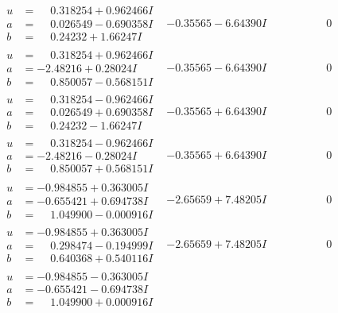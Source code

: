 \documentclass[1p]{elsarticle_modified}
\theoremstyle{definition}
\begin{document}
$$\begin{array}{c|c|c}
\begin{aligned}
u &= \phantom{-}0.318254 + 0.962466 I \\
a &= \phantom{-}0.026549 - 0.690358 I \\
b &= \phantom{-}0.24232 + 1.66247 I\end{aligned}
 & -0.35565 - 6.64390 I & \phantom{-0.000000 } 0 \\ \hline\begin{aligned}
u &= \phantom{-}0.318254 + 0.962466 I \\
a &= -2.48216 + 0.28024 I \\
b &= \phantom{-}0.850057 - 0.568151 I\end{aligned}
 & -0.35565 - 6.64390 I & \phantom{-0.000000 } 0 \\ \hline\begin{aligned}
u &= \phantom{-}0.318254 - 0.962466 I \\
a &= \phantom{-}0.026549 + 0.690358 I \\
b &= \phantom{-}0.24232 - 1.66247 I\end{aligned}
 & -0.35565 + 6.64390 I & \phantom{-0.000000 } 0 \\ \hline\begin{aligned}
u &= \phantom{-}0.318254 - 0.962466 I \\
a &= -2.48216 - 0.28024 I \\
b &= \phantom{-}0.850057 + 0.568151 I\end{aligned}
 & -0.35565 + 6.64390 I & \phantom{-0.000000 } 0 \\ \hline\begin{aligned}
u &= -0.984855 + 0.363005 I \\
a &= -0.655421 + 0.694738 I \\
b &= \phantom{-}1.049900 - 0.000916 I\end{aligned}
 & -2.65659 + 7.48205 I & \phantom{-0.000000 } 0 \\ \hline\begin{aligned}
u &= -0.984855 + 0.363005 I \\
a &= \phantom{-}0.298474 - 0.194999 I \\
b &= \phantom{-}0.640368 + 0.540116 I\end{aligned}
 & -2.65659 + 7.48205 I & \phantom{-0.000000 } 0 \\ \hline\begin{aligned}
u &= -0.984855 - 0.363005 I \\
a &= -0.655421 - 0.694738 I \\
b &= \phantom{-}1.049900 + 0.000916 I\end{aligned}

\end{array}$$
\end{document}
